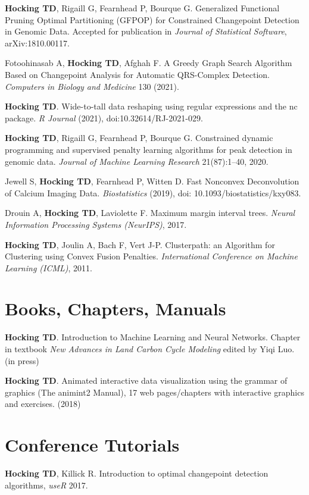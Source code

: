 \documentclass[margin,line]{res}
\begin{document}
\begin{resume}
{\bf Hocking TD}, Rigaill G, Fearnhead P, Bourque G. Generalized
Functional Pruning Optimal Partitioning (GFPOP) for Constrained
Changepoint Detection in Genomic Data. Accepted for publication in
{\it Journal of Statistical Software}, arXiv:1810.00117.

Fotoohinasab A, {\bf Hocking TD}, Afghah F. A Greedy Graph Search
Algorithm Based on Changepoint Analysis for Automatic QRS-Complex
Detection. {\it Computers in Biology and Medicine} 130 (2021).

{\bf Hocking TD}. Wide-to-tall data reshaping using regular
expressions and the nc package. {\it R Journal} (2021),
doi:10.32614/RJ-2021-029.

{\bf Hocking TD}, Rigaill G, Fearnhead P, Bourque G. Constrained
dynamic programming and supervised penalty learning algorithms for
peak detection in genomic data. {\it Journal of Machine Learning
  Research} 21(87):1--40, 2020.

Jewell S, {\bf Hocking TD}, Fearnhead P, Witten D. Fast Nonconvex
Deconvolution of Calcium Imaging Data. {\it Biostatistics} (2019), doi:
10.1093/biostatistics/kxy083.

Drouin A, {\bf Hocking TD}, Laviolette F. Maximum margin interval
trees. {\it Neural Information Processing Systems (NeurIPS)}, 2017.

{\bf Hocking TD}, Joulin A, Bach F, Vert J-P. Clusterpath: an
Algorithm for Clustering using Convex Fusion Penalties. {\it International
Conference on Machine Learning (ICML)}, 2011.

\section{\sc Books, Chapters, Manuals}

{\bf Hocking TD}. Introduction to Machine Learning and Neural
Networks. Chapter in textbook {\it New Advances in Land Carbon Cycle
  Modeling} edited by Yiqi Luo. (in press)

{\bf Hocking TD}. Animated interactive data visualization using the
grammar of graphics (The animint2 Manual), 17 web pages/chapters with
interactive graphics and exercises. (2018)

\section{\sc Conference Tutorials}

{\bf Hocking TD}, Killick R. Introduction to optimal changepoint
detection algorithms, {\it useR} 2017.


\end{resume}
\end{document}
